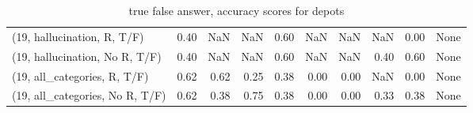 \begin{table*}[h!]
\begin{adjustbox}{width=2\columnwidth,center}
\begin{tabular}{lrrr|rrr|rrr}
(19, hallucination, R, T/F)           &                      0.40 &                   NaN &                       NaN &                          0.60 &                       NaN &                           NaN &                                    NaN &                               0.00 &                                  None \\
(19, hallucination, No R, T/F)        &                      0.40 &                   NaN &                       NaN &                          0.60 &                       NaN &                           NaN &                                   0.40 &                               0.60 &                                  None \\
(19, all\_categories, R, T/F)          &                      0.62 &                  0.62 &                      0.25 &                          0.38 &                      0.00 &                          0.00 &                                    NaN &                               0.00 &                                  None \\
(19, all\_categories, No R, T/F)       &                      0.62 &                  0.38 &                      0.75 &                          0.38 &                      0.00 &                          0.00 &                                   0.33 &                               0.38 &                                  None \\


\bottomrule
\end{tabular}
\end{adjustbox}
\caption{true false answer, accuracy scores for depots}
\end{table*}